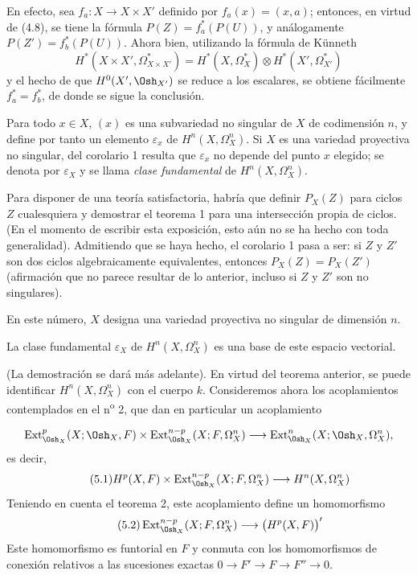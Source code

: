 En efecto, sea $f_a:X\longrightarrow X\times X'$ definido por
$f_a(x)=(x,a)$; entonces, en virtud de (4.8), se tiene la fórmula
$P(Z)=f_a^{*}(P(U))$, y análogamente $P(Z')=f_b^{*}(P(U))$. Ahora bien, utilizando la fórmula de
Künneth
\[
  H^{*}(X\times X',\Omega_{X\times X'}^{*})
  =H^{*}(X,\Omega_X^{*})\otimes H^{*}(X',\Omega_{X'}^{*})
\]
y el hecho de que $H^{0}(X',\Osh_{X'})$ se reduce a los escalares, se obtiene
fácilmente $f_a^{*}=f_b^{*}$, de donde se sigue la conclusión.

Para todo $x\in X$, $(x)$ es una subvariedad no singular de $X$ de
codimensión $n$, y define por tanto un elemento $\varepsilon_x$ de
$H^{n}(X,\Omega_X^{n})$. Si $X$ es una variedad proyectiva no singular, del
corolario 1 resulta que $\varepsilon_x$ no depende del punto $x$ elegido; se
denota por $\varepsilon_X$ y se llama \emph{clase fundamental} de
$H^{n}(X,\Omega_X^{n})$.

 Para disponer de una teoría satisfactoria, habría que definir
$P_X(Z)$ para ciclos $Z$ cualesquiera y demostrar el teorema 1 para una
intersección propia de ciclos. (En el momento de escribir esta exposición, esto aún no se
ha hecho con toda generalidad). Admitiendo que se haya hecho, el corolario 1
pasa a ser: si $Z$ y $Z'$ son dos ciclos algebraicamente equivalentes, entonces
$P_X(Z)=P_X(Z')$ (afirmación que no parece resultar de lo anterior, incluso si
$Z$ y $Z'$ son no singulares).


En este número, $X$ designa una variedad proyectiva no singular de dimensión
$n$.

 La clase fundamental $\varepsilon_X$ de
$H^{n}(X,\Omega_X^{n})$ es una base de este espacio vectorial.

(La demostración se dará más adelante). En virtud del teorema anterior, se puede
identificar $H^{n}(X,\Omega_X^{n})$ con el cuerpo $k$. Consideremos ahora los
acoplamientos contemplados en el n\textsuperscript{o} 2, que dan en particular un
acoplamiento

\[
\operatorname{Ext}_{\Osh_X}^{p}(X;\Osh_X,F)
\times\operatorname{Ext}_{\Osh_X}^{n-p}(X;F,\Omega_X^{n})
\longrightarrow
\operatorname{Ext}_{\Osh_X}^{n}(X;\Osh_X,\Omega_X^{n}),
\]
es decir,
\begin{equation}\tag{5.1}
  H^{p}(X,F)
  \times\operatorname{Ext}_{\Osh_X}^{n-p}(X;F,\Omega_X^{n})
  \longrightarrow H^{n}(X,\Omega_X^{n})
\end{equation}
Teniendo en cuenta el teorema 2, este acoplamiento define un homomorfismo
\begin{equation}\tag{5.2}
  \operatorname{Ext}_{\Osh_X}^{n-p}(X;F,\Omega_X^{n})
  \longrightarrow\bigl(H^{p}(X,F)\bigr)'
\end{equation}
Este homomorfismo es funtorial en $F$ y conmuta con los homomorfismos de conexión
relativos a las sucesiones exactas $0\longrightarrow F'\longrightarrow F
\longrightarrow F''\longrightarrow0$.

